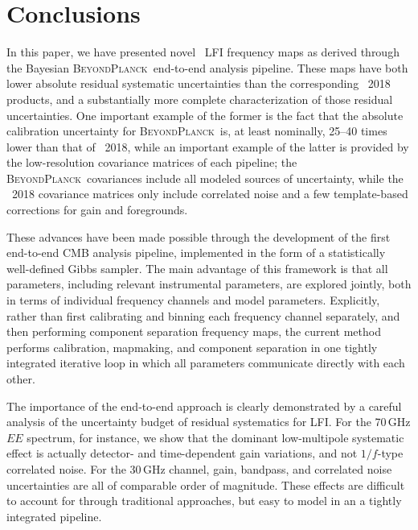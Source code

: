 \documentclass[twocolumn]{aa}
\newcommand{\BP}{\textsc{BeyondPlanck}}
\begin{document}
\section{Conclusions}
\label{sec:summary}

In this paper, we have presented novel \Planck\ LFI frequency maps as
derived through the Bayesian \BP\ end-to-end analysis pipeline. These
maps have both lower absolute residual systematic uncertainties than
the corresponding \Planck\ 2018 products, and a substantially more complete
characterization of those residual uncertainties. One important
example of the former is the fact that the absolute calibration
uncertainty for \BP\ is, at least nominally, 25--40 times lower than
that of \Planck\ 2018, while an important example of the latter is
provided by the low-resolution covariance matrices of each pipeline;
the \BP\ covariances include all modeled sources of uncertainty,
while the \Planck\ 2018 covariance matrices only include correlated
noise and a few template-based corrections for gain and foregrounds.

These advances have been made possible through the development of the
first end-to-end CMB analysis pipeline, implemented in the form of a
statistically well-defined Gibbs sampler. The main advantage of this
framework is that all parameters, including relevant instrumental parameters, 
are explored jointly, both in terms of individual frequency channels and model
parameters. Explicitly, rather than first calibrating and binning each
frequency channel separately, and then performing component separation 
frequency maps, the current method performs
calibration, mapmaking, and component separation in one tightly
integrated iterative loop in which all parameters communicate directly
with each other.

The importance of the end-to-end approach is clearly demonstrated 
by a careful analysis of the uncertainty budget of residual systematics 
for LFI. For the 70\,GHz $EE$ spectrum, for instance, we show that the 
dominant low-multipole systematic effect is actually detector- and time-dependent gain
variations, and not $1/f$-type correlated noise. For the 30\,GHz
channel, gain, bandpass, and correlated noise uncertainties are all of
comparable order of magnitude. These effects are difficult to
account for through traditional approaches, but easy to model in an a
tightly integrated pipeline.
\end{document}
